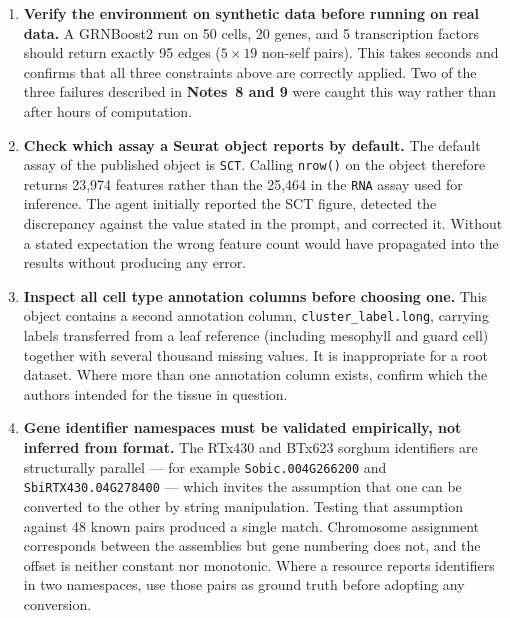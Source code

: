 \begin{enumerate}[leftmargin=*]
\item \textbf{Verify the environment on synthetic data before running on real data.} A GRNBoost2 run on 50 cells, 20 genes, and 5 transcription factors should return exactly 95 edges ($5 \times 19$ non-self pairs). This takes seconds and confirms that all three constraints above are correctly applied. Two of the three failures described in \textbf{Notes~8 and 9} were caught this way rather than after hours of computation.

\item \textbf{Check which assay a Seurat object reports by default.} The default assay of the published object is \texttt{SCT}. Calling \texttt{nrow()} on the object therefore returns 23,974 features rather than the 25,464 in the \texttt{RNA} assay used for inference. The agent initially reported the SCT figure, detected the discrepancy against the value stated in the prompt, and corrected it. Without a stated expectation the wrong feature count would have propagated into the results without producing any error.

\item \textbf{Inspect all cell type annotation columns before choosing one.} This object contains a second annotation column, \texttt{cluster\_label.long}, carrying labels transferred from a leaf reference (including mesophyll and guard cell) together with several thousand missing values. It is inappropriate for a root dataset. Where more than one annotation column exists, confirm which the authors intended for the tissue in question.


\item \textbf{Gene identifier namespaces must be validated empirically, not inferred from format.} The RTx430 and BTx623 sorghum identifiers are structurally parallel --- for example \texttt{Sobic.004G266200} and \texttt{SbiRTX430.04G278400} --- which invites the assumption that one can be converted to the other by string manipulation. Testing that assumption against 48 known pairs produced a single match. Chromosome assignment corresponds between the assemblies but gene numbering does not, and the offset is neither constant nor monotonic. Where a resource reports identifiers in two namespaces, use those pairs as ground truth before adopting any conversion.


\end{enumerate}

